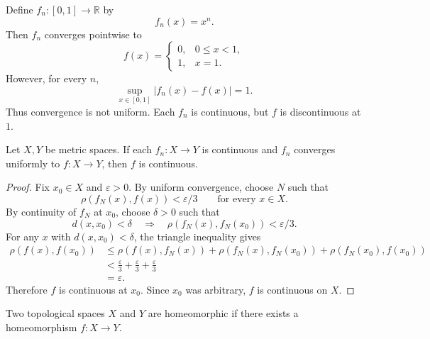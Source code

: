 \documentclass[answers,12pt,addpoints]{exam}
\begin{document}
\begin{example}
Define $f_n:[0,1]\to\mathbb{R}$ by
\[
f_n(x)=x^n.
\]
Then $f_n$ converges pointwise to
\[
f(x)=
\begin{cases}
0,&0\leq x<1,\\
1,&x=1.
\end{cases}
\]
However, for every $n$,
\[
\sup_{x\in[0,1]}|f_n(x)-f(x)|=1.
\]
Thus convergence is not uniform.
Each $f_n$ is continuous, but $f$ is discontinuous at $1$.
\end{example}

\begin{theorem}
Let $X,Y$ be metric spaces.
If each $f_n:X\to Y$ is continuous and $f_n$ converges
uniformly to $f:X\to Y$, then $f$ is continuous.
\end{theorem}

\begin{proof}
Fix $x_0\in X$ and $\varepsilon>0$.
By uniform convergence, choose $N$ such that
\[
\rho(f_N(x),f(x))<\varepsilon/3
\qquad\text{for every }x\in X.
\]
By continuity of $f_N$ at $x_0$, choose $\delta>0$ such that
\[
d(x,x_0)<\delta
\quad\Longrightarrow\quad
\rho(f_N(x),f_N(x_0))<\varepsilon/3.
\]
For any $x$ with $d(x,x_0)<\delta$, the triangle inequality
gives
\[
\begin{aligned}
\rho(f(x),f(x_0))
&\leq
\rho(f(x),f_N(x))
+\rho(f_N(x),f_N(x_0))
+\rho(f_N(x_0),f(x_0))\\
&<
\frac{\varepsilon}{3}
+\frac{\varepsilon}{3}
+\frac{\varepsilon}{3}\\
&=\varepsilon.
\end{aligned}
\]
Therefore $f$ is continuous at $x_0$.
Since $x_0$ was arbitrary, $f$ is continuous on $X$.
\end{proof}

\begin{definition}
Two topological spaces $X$ and $Y$ are homeomorphic if
there exists a homeomorphism $f:X\to Y$.
\end{definition}
\end{document}
